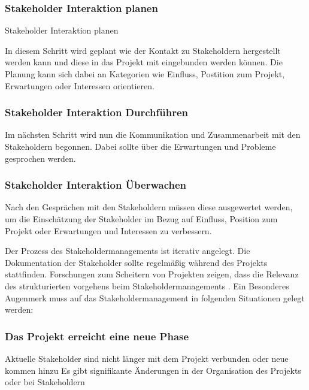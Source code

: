 \documentclass[ThesisDJ.tex]{subfiles}
\begin{document}
\subsubsection{Stakeholder Interaktion planen}
Stakeholder Interaktion planen

In diesem Schritt wird geplant wie der Kontakt zu Stakeholdern hergestellt werden kann und diese in das Projekt mit eingebunden werden können. 
Die Planung kann sich dabei an Kategorien wie Einfluss, Postition zum Projekt, Erwartungen oder Interessen orientieren.

\subsubsection{Stakeholder Interaktion Durchführen}


Im nächsten Schritt wird nun die Kommunikation und Zusammenarbeit mit den Stakeholdern begonnen. 
Dabei sollte über die Erwartungen und Probleme gesprochen werden.

\subsubsection{Stakeholder Interaktion Überwachen}

Nach den Gesprächen mit den Stakeholdern müssen diese ausgewertet werden, um die Einschätzung der Stakeholder im Bezug auf Einfluss,
Position zum Projekt oder Erwartungen und Interessen zu verbessern.


Der Prozess des Stakeholdermanagements ist iterativ angelegt. Die Dokumentation der Stakeholder sollte regelmäßig während
des Projekts stattfinden. Forschungen zum Scheitern von Projekten zeigen, dass die Relevanz des strukturierten vorgehens 
beim Stakeholdermanagements \cite[S.~488]{project_management_institute_guide_2017}.
Ein Besonderes Augenmerk muss auf das Stakeholdermanagement in folgenden Situationen gelegt werden:

\subsubsection{Das Projekt erreicht eine neue Phase}
Aktuelle Stakeholder sind nicht länger mit dem Projekt verbunden oder neue kommen hinzu
Es gibt signifikante Änderungen in der Organisation des Projekts oder bei Stakeholdern
\end{document}
